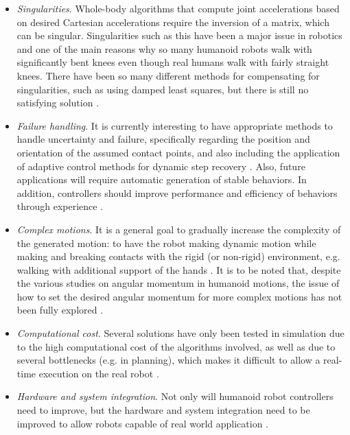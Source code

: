 \begin{itemize}
		\item \emph{Singularities}.
					Whole-body algorithms that compute joint accelerations based on desired Cartesian accelerations
					require the inversion of a matrix, which can be singular.
					Singularities such as this have been a major issue in robotics and one of the main reasons why
					so many humanoid robots walk with significantly bent knees even though real humans walk with
					fairly straight	knees.
					There have been so many different methods for compensating for singularities, such as using
					damped least squares, but there is still no satisfying solution \cite{Koolen_IJHR2016}.
					
		\item \emph{Failure handling}.
					It is currently interesting to have appropriate methods to handle uncertainty and failure,
					specifically regarding the position and orientation of the assumed contact points, and also
					including the application of adaptive control methods for dynamic step recovery
					\cite{Lengagne_IJRR2013} \cite{Hopkins_IJHR2016}.
					Also, future applications will require automatic generation of stable behaviors.
					In addition, controllers should improve performance and efficiency of behaviors through
					experience \cite{Stephens_PhDThesis2011}.
					
		\item \emph{Complex motions}.
					It is a general goal to gradually increase the complexity of the generated motion:
					to have the robot making dynamic motion while making and breaking contacts with the rigid
					(or non-rigid)	environment, e.g. walking with additional support of the hands
					\cite{Koenemann_IROS2015}.
					It is to be noted that, despite the various studies on angular momentum in humanoid motions,
					the issue of how to set the desired angular momentum for more complex motions has not been
					fully explored \cite{LeeS_AutoRobots2012}.
					
		\item \emph{Computational cost}.
					Several solutions have only been tested in simulation due to the high computational cost of the
					algorithms involved, as well as due to several bottlenecks (e.g. in planning), which makes it
					difficult to allow a real-time execution on the real robot \cite{Kudruss_Humanoids2015}.
					
		\item \emph{Hardware and system integration}.
					Not only will humanoid robot controllers need to improve, but the hardware and system integration
					need to be improved to allow robots capable of real world application \cite{Stephens_PhDThesis2011}.
	
	\end{itemize}
	

	
	

	
	

	

	

	
	

	

	
	